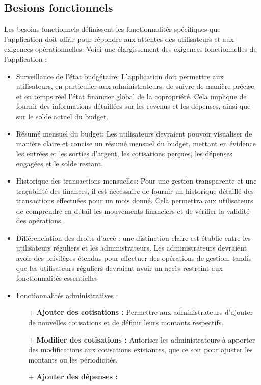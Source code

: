 \subsection{Besions fonctionnels}
Les besoins fonctionnels définissent les fonctionnalités spécifiques que l'application doit offrir pour répondre aux attentes des utilisateurs et aux exigences opérationnelles. 
Voici une élargissement des exigences fonctionnelles de l'application :
\begin{itemize}
    \item Surveillance de l'état budgétaire: L'application doit permettre aux utilisateurs, en particulier aux administrateurs, de suivre de manière précise et en temps réel l'état financier global de la copropriété. Cela implique de fournir des informations détaillées sur les revenus et les dépenses, ainsi que sur le solde actuel du budget.
    \item Résumé mensuel du budget: Les utilisateurs devraient pouvoir visualiser de manière claire et concise un résumé mensuel du budget, mettant en évidence les entrées et les sorties d'argent, les cotisations perçues, les dépenses engagées et le solde restant.
    \item Historique des transactions mensuelles: Pour une gestion transparente et une traçabilité des finances, il est nécessaire de fournir un historique détaillé des transactions effectuées pour un mois donné. Cela permettra aux utilisateurs de comprendre en détail les mouvements financiers et de vérifier la validité des opérations.
    \item Différenciation des droits d'accè : une distinction claire est établie  entre les utilisateurs réguliers et les administrateurs. Les administrateurs devraient avoir des privilèges étendus pour effectuer des opérations de gestion, tandis que les utilisateurs réguliers devraient avoir un accès restreint aux fonctionnalités essentielles
    \item Fonctionnalités administratives : 
    \begin{itemize}
        \item[+] \textbf{Ajouter des cotisations : }
        Permettre aux administrateurs d'ajouter de nouvelles cotisations et de définir leurs montants respectifs.
        \item[+] \textbf{Modifier des cotisations :}
        Autoriser les administrateurs à apporter des modifications aux cotisations existantes, que ce soit pour ajuster les montants ou les périodicités.
        \item[+] \textbf{Ajouter des dépenses :}

\end{itemize}
\end{itemize}
